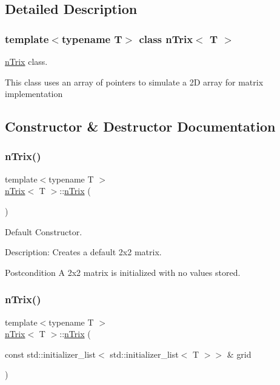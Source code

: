 \subsection{Detailed Description}
\subsubsection*{template$<$typename T$>$\newline
class n\+Trix$<$ T $>$}

\hyperlink{classnTrix}{n\+Trix} class. 

This class uses an array of pointers to simulate a 2D array for matrix implementation 

\subsection{Constructor \& Destructor Documentation}
\mbox{\label{classnTrix_a1f99b7fa79bb2f28ffd014591c55d3a1}} 
\subsubsection{\texorpdfstring{n\+Trix()}{nTrix()}\hspace{0.1cm}{\footnotesize\ttfamily [1/5]}}
{\footnotesize\ttfamily template$<$typename T $>$ \\
\hyperlink{classnTrix}{n\+Trix}$<$ T $>$\+::\hyperlink{classnTrix}{n\+Trix} (\begin{DoxyParamCaption}{ }\end{DoxyParamCaption})}



Default Constructor. 

Description\+: Creates a default 2x2 matrix. \begin{DoxyPostcond}{Postcondition}
A 2x2 matrix is initialized with no values stored. 
\end{DoxyPostcond}
\mbox{\label{classnTrix_ad7dd393c0056a77c9ebeb551112e2f7c}} 
\subsubsection{\texorpdfstring{n\+Trix()}{nTrix()}\hspace{0.1cm}{\footnotesize\ttfamily [2/5]}}
{\footnotesize\ttfamily template$<$typename T $>$ \\
\hyperlink{classnTrix}{n\+Trix}$<$ T $>$\+::\hyperlink{classnTrix}{n\+Trix} (\begin{DoxyParamCaption}\item[{const std\+::initializer\+\_\+list$<$ std\+::initializer\+\_\+list$<$ T $>$$>$ \&}]{grid }\end{DoxyParamCaption})}



